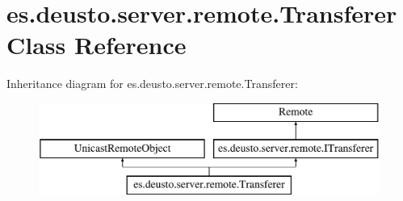\hypertarget{classes_1_1deusto_1_1server_1_1remote_1_1_transferer}{}\section{es.\+deusto.\+server.\+remote.\+Transferer Class Reference}
\label{classes_1_1deusto_1_1server_1_1remote_1_1_transferer}
Inheritance diagram for es.\+deusto.\+server.\+remote.\+Transferer\+:\begin{figure}[H]
\begin{center}
\leavevmode
\includegraphics[height=3.000000cm]{classes_1_1deusto_1_1server_1_1remote_1_1_transferer}
\end{center}
\end{figure}
